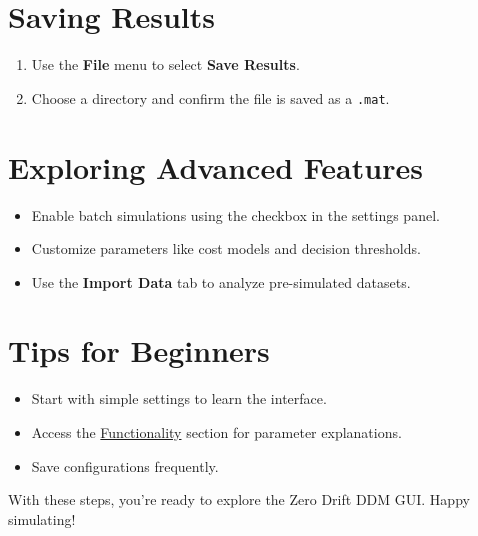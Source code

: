 \section{Saving Results}
\begin{enumerate}
    \item Use the \textbf{File} menu to select \textbf{Save Results}.
    \item Choose a directory and confirm the file is saved as a \texttt{.mat}.
\end{enumerate}

\section{Exploring Advanced Features}
\begin{itemize}
    \item Enable batch simulations using the checkbox in the settings panel.
    \item Customize parameters like cost models and decision thresholds.
    \item Use the \textbf{Import Data} tab to analyze pre-simulated datasets.
\end{itemize}

\section{Tips for Beginners}
\begin{itemize}
    \item Start with simple settings to learn the interface.
    \item Access the \hyperref[ch:functionality]{Functionality} section for parameter explanations.
    \item Save configurations frequently.
\end{itemize}

With these steps, you're ready to explore the Zero Drift DDM GUI. Happy simulating!